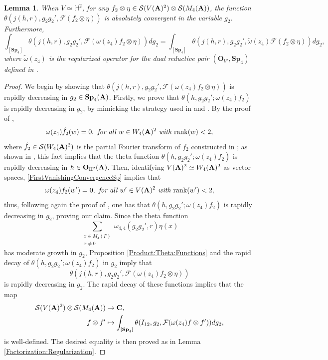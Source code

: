 \documentclass[11pt, reqno]{amsart}
\theoremstyle{plain}
\newtheorem{lemma}[theorem]{Lemma}
\theoremstyle{definition}
\theoremstyle{remark}
\theoremstyle{plain}
\def\C{{\bf C}}
\def\A{{\bf A}}
\def\Sp{{\mathbf{Sp}}}
\begin{document}
\begin{lemma}\label{Regularization:SW:Sp}
    When $V\simeq \mathbb{H}^2$, for any $f_2\otimes \eta\in \mathcal{S}(V(\A)^2)\otimes \mathcal{S}(M_4(\A))$, the function $\theta(j(h,r),g_2g_2',\mathcal{F}(f_2\otimes \eta))$ is absolutely convergent in the variable $g_2$. Furthermore,
    \[\int_{[\Sp_4]}\theta(j(h,r),g_2g_2',\mathcal{F}(\omega(z_4)f_2\otimes \eta))dg_2 = \int_{[\Sp_4]}\theta(j(h,r),g_2g_2',\tilde{\omega}(z_4)\mathcal{F}(f_2\otimes \eta))dg_2,\] 
    where $\tilde{\omega}(z_4)$ is the regularized operator for the dual reductive pair $(\mathbf{O}_{V'},\Sp_4)$ defined in \cite{IchinoSW}.
\end{lemma}
\begin{proof}
    We begin by showing that $\theta(j(h,r),g_2g_2',\mathcal{F}(\omega(z_4)f_2\otimes \eta))$ is rapidly decreasing in $g_2\in \Sp_4(\A)$. 
   Firstly, we prove that  $\theta(h,g_2g_2';\omega(z_4)f_2)$ is rapidly decreasing in $g_2$, by mimicking the strategy used in  \cite[Proposition 1.5]{IchinoSW} and \cite[Proposition 5.3.1]{KudlaRallis}. By the proof of \cite[Proposition 1.5]{IchinoSW}, 
\begin{equation}\label{FirstVanishingConvergenceSp}\omega(z_4)\hat{f_2}(w) = 0,\textit{ for all }w\in W_4(\A)^2\textit{ with }\mathrm{rank}(w)<2,\end{equation}
 where $\hat{f_2}\in \mathcal{S}(W_4(\A)^2)$ is the partial Fourier transform of $f_2$ constructed in \cite[(5.2.4)]{KudlaRallis}; as shown in \cite[Proposition 1.5]{IchinoSW}, this fact implies that the theta function $\theta(h,g_2g_2';\omega(z_4)f_2)$ is rapidly decreasing in $h\in \mathbf{O}_{\mathbb{H}^2}(\A)$. 
 Then, identifying 
 $V(\A)^2 \simeq W_4(\A)^2$ as vector spaces,  \eqref{FirstVanishingConvergenceSp} implies that
   \[\omega(z_4)f_2(w') = 0,\textit{ for all }w'\in V(\A)^2\textit{ with }\mathrm{rank}(w')<2,\]
   thus, following again the proof of \cite[Proposition 1.5]{IchinoSW}, one has that $\theta(h,g_2g_2';\omega(z_4)f_2)$ is rapidly decreasing in $g_2$, proving our claim.  Since the theta function \[\sum_{\substack{x\in M_4(F)\\x\neq 0}}\omega_{4,4}(g_2g_2',r)\eta(x)\]
   has moderate growth in $g_2$, Proposition \ref{Product:Theta:Functions} and the rapid decay of $\theta(h,g_2g_2';\omega(z_4)f_2)$ in $g_2$ imply that \[\theta(j(h,r),g_2g_2',\mathcal{F}(\omega(z_4)f_2\otimes \eta))\]
 is rapidly decreasing in $g_2$. 
The rapid decay of these functions implies that the map 
   \begin{align*}
        \mathcal{S}(V(\A)^2)\otimes \mathcal{S}(M_4(\A))&\to \C,\\
       f\otimes f'&\mapsto \int_{[\Sp_4]}\theta(I_{12},g_2,\mathcal{F}(\omega(z_4)f\otimes f'))dg_2,
   \end{align*}
   is well-defined. The desired equality is then proved as in Lemma \ref{Factorization:Regularization}.
 \end{proof}
\end{document}
